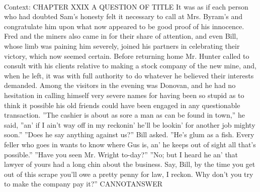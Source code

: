 \documentclass[11pt,a4paper, onecolumn]{article}
\begin{document}
\\ Context: CHAPTER XXIX A QUESTION OF TITLE It was as if each person who had doubted Sam's honesty felt it necessary to call at Mrs. Byram's and congratulate him upon what now appeared to be good proof of his innocence. Fred and the miners also came in for their share of attention, and even Bill, whose limb was paining him severely, joined his partners in celebrating their victory, which now seemed certain. Before returning home Mr. Hunter called to consult with his clients relative to making a stock company of the new mine, and, when he left, it was with full authority to do whatever he believed their interests demanded. Among the visitors in the evening was Donovan, and he had no hesitation in calling himself very severe names for having been so stupid as to think it possible his old friends could have been engaged in any questionable transaction. ''The cashier is about as sore a man as can be found in town,'' he said, ''an' if I ain't way off in my reckonin' he'll be lookin' for another job mighty soon.'' ''Does he say anything against us?'' Bill asked. ''He's glum as a fish. Every feller who goes in wants to know where Gus is, an' he keeps out of sight all that's possible.'' ''Have you seen Mr. Wright to-day?'' ''No; but I heard he an' that lawyer of yours had a long chin about the business. Say, Bill, by the time you get out of this scrape you'll owe a pretty penny for law, I reckon. Why don't you try to make the company pay it?'' CANNOTANSWER
\end{document}
